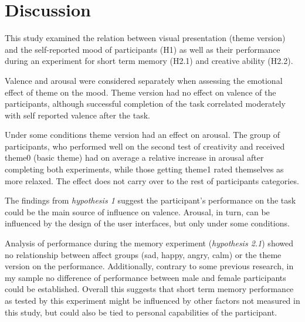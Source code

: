 \section{Discussion} \label{sec:discussion}

	

	This study examined the relation between visual presentation (theme version) and the self-reported mood of participants (H1) as well as their performance during an experiment for short term memory (H2.1) and creative ability (H2.2).
	
	Valence and arousal were considered separately when assessing the emotional effect of theme on the mood. Theme version had no effect on valence of the participants, although successful completion of the task correlated moderately with self reported valence after the task.
	
	Under some conditions theme version had an effect on arousal.
	The group of participants, who performed well on the second test of creativity and received theme0 (basic theme) had on average a relative increase in arousal after completing both experiments, while those getting theme1 rated themselves as more relaxed. The effect does not carry over to the rest of participants categories. 
	
	The findings from \textit{hypothesis 1} suggest the participant's performance on the task could be the main source of influence on valence. Arousal, in turn, can be influenced by the design of the user interfaces, but only under some conditions.
	

	Analysis of performance during the memory experiment (\textit{hypothesis 2.1}) showed no relationship between affect groups (sad, happy, angry, calm) or the theme version on the performance. Additionally, contrary to some previous research, in my sample no difference of performance between male and female participants could be established. Overall this suggests that short term memory performance as tested by this experiment might be influenced by other factors not measured in this study, but could also be tied to personal capabilities of the participant.
	
